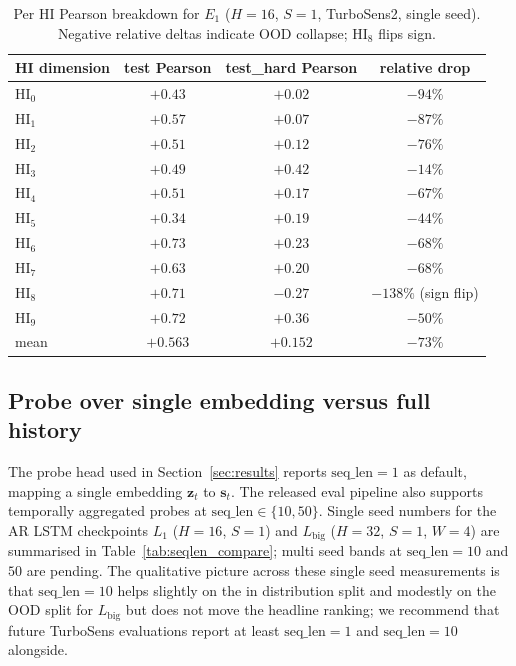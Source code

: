 \begin{table}[h]
\centering
\caption{Per HI Pearson breakdown for $E_1$ ($H{=}16$, $S{=}1$,
TurboSens2, single seed). Negative relative deltas indicate OOD
collapse; HI$_8$ flips sign.}
\label{tab:per_hi_e1}
\small
\begin{tabular}{l c c c}
\toprule
HI dimension & test Pearson & test\_hard Pearson & relative drop \\
\midrule
HI$_0$ & $+0.43$ & $+0.02$ & $-94\%$ \\
HI$_1$ & $+0.57$ & $+0.07$ & $-87\%$ \\
HI$_2$ & $+0.51$ & $+0.12$ & $-76\%$ \\
HI$_3$ & $+0.49$ & $+0.42$ & $-14\%$ \\
HI$_4$ & $+0.51$ & $+0.17$ & $-67\%$ \\
HI$_5$ & $+0.34$ & $+0.19$ & $-44\%$ \\
HI$_6$ & $+0.73$ & $+0.23$ & $-68\%$ \\
HI$_7$ & $+0.63$ & $+0.20$ & $-68\%$ \\
HI$_8$ & $+0.71$ & $-0.27$ & $-138\%$ (sign flip) \\
HI$_9$ & $+0.72$ & $+0.36$ & $-50\%$ \\
\midrule
mean   & $+0.563$ & $+0.152$ & $-73\%$ \\
\bottomrule
\end{tabular}
\end{table}

\subsection{Probe over single embedding versus full history}
\label{sec:per_archetype}

The probe head used in Section~\ref{sec:results} reports
$\mathrm{seq\_len}{=}1$ as default, mapping a single embedding
$\mathbf{z}_t$ to $\mathbf{s}_t$. The released eval pipeline also
supports temporally aggregated probes at $\mathrm{seq\_len} \in
\{10, 50\}$. Single seed numbers for the AR LSTM checkpoints
$L_1$ ($H{=}16$, $S{=}1$) and $L_\mathrm{big}$ ($H{=}32$, $S{=}1$,
$W{=}4$) are summarised in Table~\ref{tab:seqlen_compare}; multi
seed bands at $\mathrm{seq\_len}{=}10$ and $50$ are pending. The
qualitative picture across these single seed measurements is that
$\mathrm{seq\_len}{=}10$ helps slightly on the in distribution split
and modestly on the OOD split for $L_\mathrm{big}$ but does not move
the headline ranking; we recommend that future TurboSens evaluations
report at least $\mathrm{seq\_len}{=}1$ and $\mathrm{seq\_len}{=}10$
alongside.

